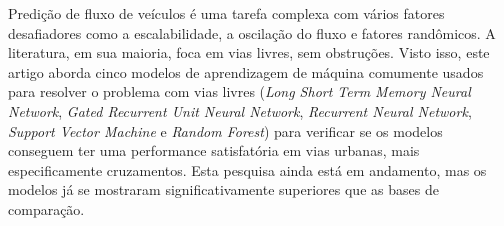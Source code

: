 Predição de fluxo de veículos é uma tarefa complexa com vários fatores desafiadores como a escalabilidade, a oscilação do fluxo e fatores randômicos. A literatura, em sua maioria, foca em vias livres, sem obstruções. Visto isso, este artigo aborda cinco modelos de aprendizagem de máquina comumente usados para resolver o problema com vias livres (\textit{Long Short Term Memory Neural Network}, \textit{Gated Recurrent Unit Neural Network}, \textit{Recurrent Neural Network}, \textit{Support Vector Machine} e \textit{Random Forest}) para verificar se os modelos conseguem ter uma performance satisfatória em vias urbanas, mais especificamente cruzamentos. Esta pesquisa ainda está em andamento, mas os modelos já se mostraram significativamente superiores que as bases de comparação.
